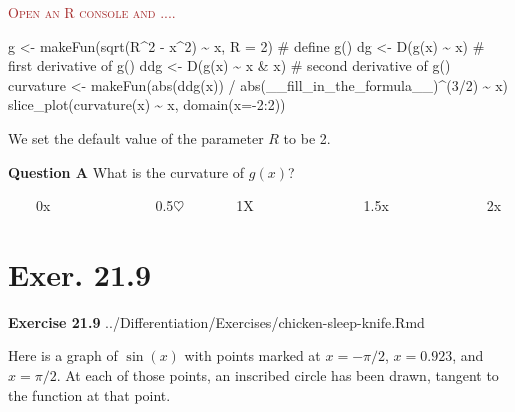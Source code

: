 \documentclass[
  letterpaper,
  DIV=11,
  numbers=noendperiod,
  oneside]{article}
\newenvironment{Shaded}{\begin{snugshade}}{\end{snugshade}}
\newcommand{\AttributeTok}[1]{\textcolor[rgb]{0.40,0.45,0.13}{#1}}
\newcommand{\CommentTok}[1]{\textcolor[rgb]{0.37,0.37,0.37}{#1}}
\newcommand{\DecValTok}[1]{\textcolor[rgb]{0.68,0.00,0.00}{#1}}
\newcommand{\FunctionTok}[1]{\textcolor[rgb]{0.28,0.35,0.67}{#1}}
\newcommand{\NormalTok}[1]{\textcolor[rgb]{0.00,0.23,0.31}{#1}}
\newcommand{\OtherTok}[1]{\textcolor[rgb]{0.00,0.23,0.31}{#1}}
\newcommand{\SpecialCharTok}[1]{\textcolor[rgb]{0.37,0.37,0.37}{#1}}
\newenvironment{scaffolding}%
{%
\textcolor{brown}{\hrulefill}%
  \par\vspace{.3\baselineskip}%
  \textcolor{brown}{\scshape Open an R console and ....}%
  \par\vspace{\baselineskip}%
}%
{\textcolor{brown}{\hrulefill}}
\begin{document}
\begin{multicols}{2}
\begin{scaffolding}
\begin{Shaded}
\begin{Highlighting}[]
\NormalTok{g }\OtherTok{\textless{}{-}} \FunctionTok{makeFun}\NormalTok{(}\FunctionTok{sqrt}\NormalTok{(R}\SpecialCharTok{\^{}}\DecValTok{2} \SpecialCharTok{{-}}\NormalTok{ x}\SpecialCharTok{\^{}}\DecValTok{2}\NormalTok{) }\SpecialCharTok{\textasciitilde{}}\NormalTok{ x, }\AttributeTok{R =} \DecValTok{2}\NormalTok{) }\CommentTok{\# define g()}
\NormalTok{dg  }\OtherTok{\textless{}{-}} \FunctionTok{D}\NormalTok{(}\FunctionTok{g}\NormalTok{(x) }\SpecialCharTok{\textasciitilde{}}\NormalTok{ x)         }\CommentTok{\# first derivative of g()}
\NormalTok{ddg }\OtherTok{\textless{}{-}} \FunctionTok{D}\NormalTok{(}\FunctionTok{g}\NormalTok{(x) }\SpecialCharTok{\textasciitilde{}}\NormalTok{ x }\SpecialCharTok{\&}\NormalTok{ x)     }\CommentTok{\# second derivative of g()}
\NormalTok{curvature }\OtherTok{\textless{}{-}} \FunctionTok{makeFun}\NormalTok{(}\FunctionTok{abs}\NormalTok{(}\FunctionTok{ddg}\NormalTok{(x)) }\SpecialCharTok{/} \FunctionTok{abs}\NormalTok{(\_\_fill\_in\_the\_formula\_\_)}\SpecialCharTok{\^{}}\NormalTok{(}\DecValTok{3}\SpecialCharTok{/}\DecValTok{2}\NormalTok{) }\SpecialCharTok{\textasciitilde{}}\NormalTok{ x)}
\FunctionTok{slice\_plot}\NormalTok{(}\FunctionTok{curvature}\NormalTok{(x) }\SpecialCharTok{\textasciitilde{}}\NormalTok{ x, }\FunctionTok{domain}\NormalTok{(}\AttributeTok{x=}\SpecialCharTok{{-}}\DecValTok{2}\SpecialCharTok{:}\DecValTok{2}\NormalTok{))}
\end{Highlighting}
\end{Shaded}

\end{scaffolding}

We set the default value of the parameter \(R\) to be 2.

\textbf{Question A} What is the curvature of \(g(x)\)?

~~~~{0{x~~~~~~~~}}~~~~~~~{0.5{\(\heartsuit\ \)}}~~~~~~~{1{︎X
~~~~~~~~}}~~~~~~~{1.5{x~~~~~~~}}~~~~~~~{2{x}}

\hypertarget{exer.-21.9}{%
\section*{Exer. 21.9}\label{exer.-21.9}}

\textbf{Exercise 21.9}
../Differentiation/Exercises/chicken-sleep-knife.Rmd

Here is a graph of \(\sin(x)\) with points marked at \(x=-\pi/2\),
\(x=0.923\), and \(x = \pi/2\). At each of those points, an inscribed
circle has been drawn, tangent to the function at that point.


\end{multicols}
\end{document}
